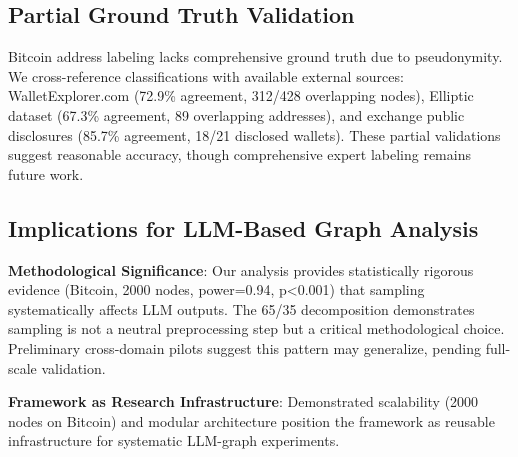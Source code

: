 \documentclass[conference]{IEEEtran}
\begin{document}
\subsection{Partial Ground Truth Validation}

Bitcoin address labeling lacks comprehensive ground truth due to pseudonymity. We cross-reference classifications with available external sources: WalletExplorer.com (72.9\% agreement, 312/428 overlapping nodes), Elliptic dataset (67.3\% agreement, 89 overlapping addresses), and exchange public disclosures (85.7\% agreement, 18/21 disclosed wallets). These partial validations suggest reasonable accuracy, though comprehensive expert labeling remains future work.

\subsection{Implications for LLM-Based Graph Analysis}

\textbf{Methodological Significance}: Our analysis provides statistically rigorous evidence (Bitcoin, 2000 nodes, power=0.94, p<0.001) that sampling systematically affects LLM outputs. The 65/35 decomposition demonstrates sampling is not a neutral preprocessing step but a critical methodological choice. Preliminary cross-domain pilots suggest this pattern may generalize, pending full-scale validation.

\textbf{Framework as Research Infrastructure}: Demonstrated scalability (2000 nodes on Bitcoin) and modular architecture position the framework as reusable infrastructure for systematic LLM-graph experiments.




\end{document}
